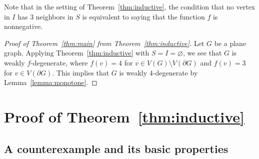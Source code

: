 \documentclass[11pt]{article}
\theoremstyle{slantthm}
\numberwithin{equation}{section}
\theoremstyle{definition}
\renewcommand{\geq}{\geqslant}
\numberwithin{equation}{section}
\newcommand{\0}{\varnothing}
\newcommand{\bdry}[1]{{\partial #1}}
\begin{document}
    Note that in the setting of Theorem~\ref{thm:inductive}, the condition that no vertex in $I$ has $3$ neighbors in $S$ is equivalent to saying that the function $f$ is nonnegative. %

    \begin{proof}[Proof of Theorem~\ref{thm:main} from Theorem~\ref{thm:inductive}]
        Let $G$ be a plane graph. %
        Applying Theorem~\ref{thm:inductive} with $S = I = \0$, we see that $G$ is weakly $f$-degenerate, where $f(v) = 4$ for $v \in V(G) \setminus V(\bdry{G})$ and $f(v) = 3$ for $v \in V(\bdry{G})$. This implies that $G$ is weakly $4$-degenerate by Lemma~\ref{lemma:monotone}.
    \end{proof}

    

    \section{Proof of Theorem~\ref{thm:inductive}}

    


    \subsection{A counterexample and its basic properties}
\end{document}
